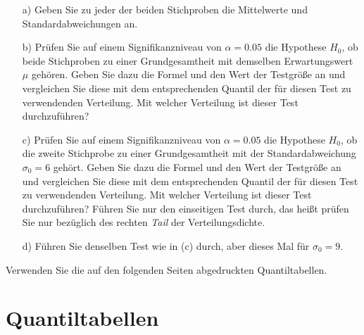 \begin{enumerate}
\item[a)] Geben Sie zu jeder der beiden Stichproben die Mittelwerte und Standardabweichungen an.
\item[b)] Prüfen Sie auf einem Signifikanzniveau von $\alpha = 0.05$ die Hypothese $H_0$,
 ob beide Stichproben zu einer Grundgesamtheit
 mit demselben Erwartungswert $\mu$ gehören. Geben Sie dazu die Formel und den Wert
 der Testgröße an und vergleichen Sie diese mit dem entsprechenden Quantil der für diesen
 Test zu verwendenden Verteilung. Mit welcher Verteilung ist dieser Test durchzuführen?
\item[c)] Prüfen Sie auf einem Signifikanzniveau von $\alpha = 0.05$ die Hypothese $H_0$,
 ob die zweite Stichprobe zu einer Grundgesamtheit
 mit der Standardabweichung $\sigma_0 = 6$ gehört. Geben Sie dazu die Formel und den Wert
 der Testgröße an und vergleichen Sie diese mit dem entsprechenden Quantil der für diesen
 Test zu verwendenden Verteilung. Mit welcher Verteilung ist dieser Test durchzuführen?
 Führen Sie nur den einseitigen Test durch, das heißt prüfen Sie nur bezüglich
 des rechten \textsl{Tail} der Verteilungsdichte.
\item[d)] Führen Sie denselben Test wie in (c) durch, aber dieses Mal für $\sigma_0 = 9$.
\end{enumerate}

Verwenden Sie die auf den folgenden Seiten abgedruckten Quantiltabellen.

\pagebreak

\section{Quantiltabellen}

